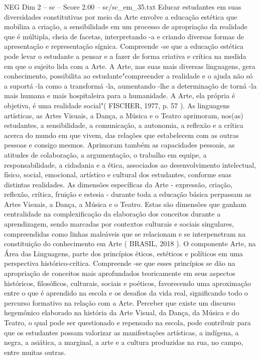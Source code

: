 \begin{textsample}{NEG Dim 2 – sc – Score 2.00 – sc/sc\_em\_35.txt}
Educar estudantes em suas diversidades constitutivas por meio da Arte envolve a educação estética que mobiliza a criação, a sensibilidade em um processo de apropriação da realidade que é múltipla, cheia de facetas, interpretando -a e criando diversas formas de apresentação e representação sígnica.
Compreende -se que a educação estética pode levar o estudante a pensar e a fazer de forma criativa e crítica na medida em que o sujeito lida com a Arte.
A Arte, nas suas mais diversas linguagens, gera conhecimento, possibilita ao estudante"compreender a realidade e o ajuda não só a suportá -la como a transformá -la, aumentando -lhe a determinação de torná -la mais humana e mais hospitaleira para a humanidade.
A Arte, ela própria é objetiva, é uma realidade social"( FISCHER, 1977, p. 57 ).
As linguagens artísticas, as Artes Visuais, a Dança, a Música e o Teatro aprimoram, nos(as) estudantes, a sensibilidade, a comunicação, a autonomia, a reflexão e a crítica acerca do mundo em que vivem, das relações que estabelecem com as outras pessoas e consigo mesmos.
Aprimoram também as capacidades pessoais, as atitudes de colaboração, a argumentação, o trabalho em equipe, a responsabilidade, a cidadania e a ética, associados ao desenvolvimento intelectual, físico, social, emocional, artístico e cultural dos estudantes, conforme suas distintas realidades.
As dimensões específicas da Arte - expressão, criação, reflexão, crítica, fruição e estesia - durante toda a educação básica perpassam as Artes Visuais, a Dança, a Música e o Teatro.
Estas são dimensões que ganham centralidade na complexificação da elaboração dos conceitos durante a aprendizagem, sendo marcadas por contextos culturais e sociais singulares, compreendidas como linhas maleáveis que se relacionam e se interpenetram na constituição do conhecimento em Arte ( BRASIL, 2018 ).
O componente Arte, na Área das Linguagens, parte dos princípios éticos, estéticos e políticos em uma perspectiva histórico-crítica.
Compreende -se que esses princípios se dão na apropriação de conceitos mais aprofundados teoricamente em seus aspectos históricos, filosóficos, culturais, sociais e poéticos, favorecendo uma aproximação entre o que é aprendido na escola e os desafios da vida real, significando todo o percurso formativo na relação com a Arte.
Perceber que existe um discurso hegemônico elaborado na história da Arte Visual, da Dança, da Música e do Teatro, o qual pode ser questionado e repensado na escola, pode contribuir para que os estudantes possam valorizar as manifestações artísticas, a indígena, a negra, a asiática, a marginal, a arte e a cultura produzidas na rua, no campo, entre muitas outras.

\end{textsample}
